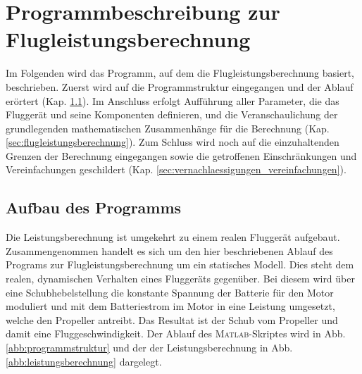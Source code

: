 \chapter{Programmbeschreibung zur Flugleistungsberechnung}
\label{chap:Programmbeschreibung}
Im Folgenden wird das Programm, auf dem die Flugleistungsberechnung basiert, beschrieben. Zuerst wird auf die Programmstruktur eingegangen und der Ablauf erörtert (Kap. \ref{sec:aufbau_des_programms}). Im Anschluss erfolgt Aufführung aller Parameter, die das Fluggerät und seine Komponenten definieren, und die Veranschaulichung der grundlegenden mathematischen Zusammenhänge für die Berechnung (Kap. \ref{sec:flugleistungsberechnung}). Zum Schluss wird noch auf die einzuhaltenden Grenzen der Berechnung eingegangen sowie die getroffenen Einschränkungen und Vereinfachungen geschildert (Kap. \ref{sec:vernachlaessigungen_vereinfachungen}).

\section{Aufbau des Programms}
\label{sec:aufbau_des_programms}
Die Leistungsberechnung ist umgekehrt zu einem realen Fluggerät aufgebaut.  Zusammengenommen handelt es sich um den hier beschriebenen Ablauf des Programs zur Flugleistungsberechnung um ein statisches Modell. Dies steht dem realen, dynamischen Verhalten eines Fluggeräts gegenüber. Bei diesem wird über eine Schubhebelstellung die konstante Spannung der Batterie für den Motor moduliert und mit dem Batteriestrom im Motor in eine Leistung umgesetzt, welche den Propeller antreibt. Das Resultat ist der Schub vom Propeller und damit eine Fluggeschwindigkeit.
Der Ablauf des \textsc{Matlab}-Skriptes wird in Abb. \ref{abb:programmstruktur} und der der Leistungsberechnung in Abb. \ref{abb:leistungsberechnung} dargelegt.



